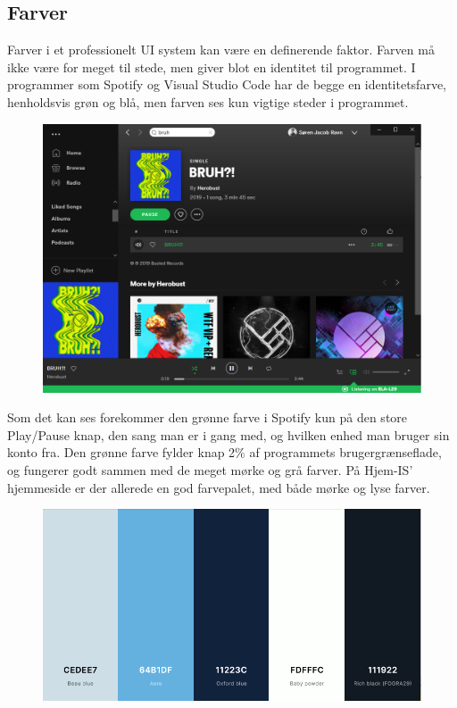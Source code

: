 \subsection{Farver}
Farver i et professionelt UI system kan være en definerende faktor. Farven må ikke være for meget til stede, men giver blot en identitet til programmet. I programmer som Spotify og Visual Studio Code har de begge en identitetsfarve, henholdsvis grøn og blå, men farven ses kun vigtige steder i programmet. 
\begin{figure}
    \centering
    \includegraphics[width=\textwidth]{figures/Preliminary/Spotify.png}
    \label{fig:spotify}
\end{figure}
Som det kan ses forekommer den grønne farve i Spotify kun på den store Play/Pause knap, den sang man er i gang med, og hvilken enhed man bruger sin konto fra. Den grønne farve fylder knap 2\% af programmets brugergrænseflade, og fungerer godt sammen med de meget mørke og grå farver. 
På Hjem-IS' hjemmeside \cite{hjemis} er der allerede en god farvepalet, med både mørke og lyse farver. 
\begin{figure}
    \centering
    \includegraphics[width=\textwidth]{figures/Preliminary/farvepalet.png}
    \label{fig:farvepalet}
\end{figure}

